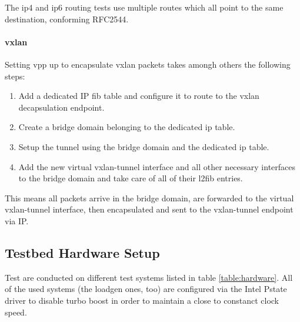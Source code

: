 The \Ac{ip4} and \Ac{ip6} routing tests use multiple routes which all point to the same destination, conforming RFC2544.

\paragraph{\Ac{vxlan}}

Setting \Ac{vpp} up to encapsulate \Ac{vxlan} packets takes amongh others the following steps: 

\begin{enumerate}
	\item Add a dedicated IP \Ac{fib} table and configure it to route to the \Ac{vxlan} decapsulation endpoint.
	\item Create a bridge domain belonging to the dedicated ip table.
	\item Setup the tunnel using the bridge domain and the dedicated ip table.
	\item Add the new virtual vxlan-tunnel interface and all other necessary interfaces to the bridge domain and take care of all of their l2fib entries. 
\end{enumerate}

This means all packets arrive in the bridge domain, are forwarded to
the virtual vxlan-tunnel interface, then encapsulated and sent to the
vxlan-tunnel endpoint via IP.


\subsection{Testbed Hardware Setup}
\label{sec:hardware}

Test are conducted on different test systems listed in table
\ref{table:hardware}. All of the used systems (the \Ac{loadgen} ones,
too) are configured via the Intel Pstate driver to disable turbo boost
in order to maintain a close to constanct clock speed.


